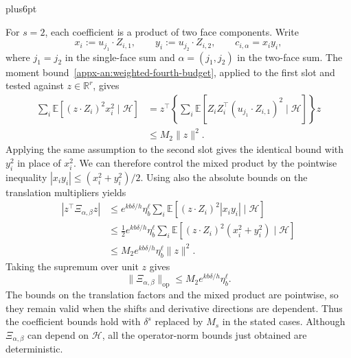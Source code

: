 \documentclass[11pt,letterpaper,twoside,leqno]{article}
\makeatletter
\theoremstyle{bookplain}
\theoremstyle{bookremark}
\renewenvironment{proof}[1][\proofname]{\par
  \pushQED{\qed}\normalfont\topsep6pt plus6pt\relax
  \trivlist\item[\hskip\labelsep\bfseries #1\@addpunct{.}]\ignorespaces
}{\popQED\endtrivlist\@endpefalse}
\newcommand{\E}{\mathbb E}
\newcommand{\R}{\mathbb R}
\newcommand{\op}{\mathrm{op}}
\makeatother
\begin{document}
\begin{proof}
For $s=2$, each coefficient is a product of two face components.
Write
\[
 x_i:=u_{j_1}\cdot Z_{i,1},\qquad
 y_i:=u_{j_2}\cdot Z_{i,2},\qquad c_{i,\alpha}=x_iy_i,
\]
where $j_1=j_2$ in the single-face sum and
$\alpha=(j_1,j_2)$ in the two-face sum. The moment
bound~\eqref{appx-an:weighted-fourth-budget}, applied to the
first slot and tested against $z\in\R^r$, gives
\[
 \begin{aligned}
 \sum_i\E[(z\cdot Z_i)^2x_i^2\mid\mathcal H]
 &=z^\top\left\{\sum_i\E[
       Z_iZ_i^\top(u_{j_1}\cdot Z_{i,1})^2
                         \mid\mathcal H]\right\}z\\
 &\le M_2\|z\|^2.
 \end{aligned}
\]
Applying the same assumption to the second slot gives the
identical bound with $y_i^2$ in place of $x_i^2$.
We can therefore control the mixed product by the pointwise
inequality $|x_iy_i|\le(x_i^2+y_i^2)/2$. Using also the
absolute bounds on the translation multipliers yields
\[
 \begin{aligned}
 |z^\top\Xi_{\alpha,\beta}z|
 &\le e^{kb\delta/h}\eta_b^\ell
       \sum_i\E[(z\cdot Z_i)^2|x_iy_i|\mid\mathcal H]\\
 &\le\frac12e^{kb\delta/h}\eta_b^\ell
       \sum_i\E[(z\cdot Z_i)^2(x_i^2+y_i^2)
                         \mid\mathcal H]\\
 &\le M_2e^{kb\delta/h}\eta_b^\ell\|z\|^2.
 \end{aligned}
\]
Taking the supremum over unit $z$ gives
\[
 \|\Xi_{\alpha,\beta}\|_{\op}
 \le M_2e^{kb\delta/h}\eta_b^\ell.
\]
The bounds on the translation factors and the mixed product are
pointwise, so they remain valid when the shifts and derivative
directions are dependent. Thus the coefficient bounds hold with
$\delta^s$ replaced by $M_s$ in the stated cases. Although
$\Xi_{\alpha,\beta}$ can depend on $\mathcal H$, all the
operator-norm bounds just obtained are deterministic.


\end{proof}
\end{document}
